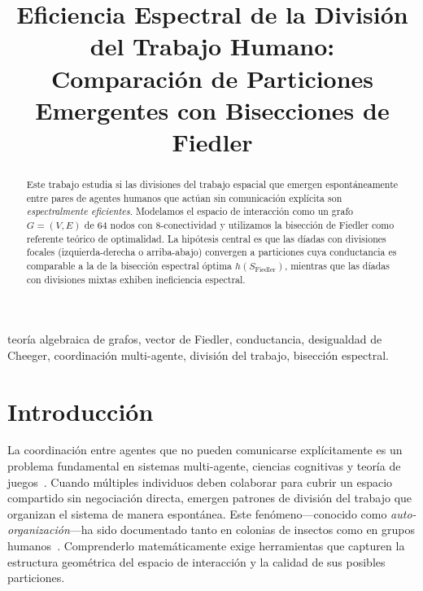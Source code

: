\documentclass[journal]{IEEEtran}
\begin{document}
\title{Eficiencia Espectral de la División del Trabajo Humano:\\ %
       Comparación de Particiones Emergentes con Bisecciones de Fiedler}

\author{
}

\maketitle

\begin{abstract}
Este trabajo estudia si las divisiones del trabajo espacial que emergen espontáneamente
entre pares de agentes humanos que actúan sin comunicación explícita son
\emph{espectralmente eficientes}. Modelamos el espacio de interacción como un grafo
$G=(V,E)$ de $64$ nodos con 8-conectividad y utilizamos la bisección de Fiedler como
referente teórico de optimalidad. La hipótesis central es que las díadas con divisiones
focales (izquierda-derecha o arriba-abajo) convergen a particiones cuya conductancia es
comparable a la de la bisección espectral óptima $h(S_{\text{Fiedler}})$, mientras que
las díadas con divisiones mixtas exhiben ineficiencia espectral.
\end{abstract}

\begin{IEEEkeywords}
teoría algebraica de grafos, vector de Fiedler, conductancia, desigualdad de Cheeger,
coordinación multi-agente, división del trabajo, bisección espectral.
\end{IEEEkeywords}


\section{Introducción}

La coordinación entre agentes que no pueden comunicarse explícitamente es un
problema fundamental en sistemas multi-agente, ciencias cognitivas y teoría de
juegos~\cite{mesbahi2010}. Cuando múltiples individuos deben colaborar para cubrir
un espacio compartido sin negociación directa, emergen patrones de división del trabajo
que organizan el sistema de manera espontánea. Este fenómeno---conocido como
\emph{auto-organización}---ha sido documentado tanto en colonias de insectos como en
grupos humanos~\cite{goldstone2024}. Comprenderlo matemáticamente exige herramientas
que capturen la estructura geométrica del espacio de interacción y la calidad de sus
posibles particiones.
\end{document}
